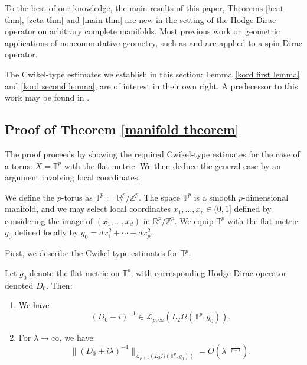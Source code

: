     To the best of our knowledge, the main results of this paper, Theorems \ref{heat thm}, \ref{zeta thm} and \ref{main thm} are new in the setting of the Hodge-Dirac operator on arbitrary complete manifolds. Most previous work on geometric applications of noncommutative geometry, such as \cite{Rennie-2004} and \cite{CGRS2} are applied to a spin Dirac operator. 
        
    The Cwikel-type estimates we establish in this section: Lemma \ref{kord first lemma} and \ref{kord second lemma}, are of interest in their own right. A predecessor to this work may be found in \cite{Rennie-2004}.
    
\subsection{Proof of Theorem \ref{manifold theorem}}

    The proof proceeds by showing the required Cwikel-type estimates for the case of a torus: $X = \mathbb{T}^p$ with the flat metric. We then
    deduce the general case by an argument involving local coordinates.
    
    
     
    We define the $p$-torus as $\mathbb{T}^p := \mathbb{R}^p/\mathbb{Z}^p$. The space $\mathbb{T}^p$ is a smooth $p$-dimensional manifold,
    and we may select local coordinates $x_1,\ldots,x_p \in (0,1]$ defined by considering the image of $(x_1,\ldots,x_d)$ in $\mathbb{R}^p/\mathbb{Z}^p$.
%     
    We equip $\mathbb{T}^p$ with the flat metric $g_0$ defined locally by $g_0 = dx_1^2+\cdots+dx_p^2$. 
    
    
    First, we describe the Cwikel-type estimates for $\mathbb{T}^p$.
    \begin{lem}\label{cwikel}
        Let $g_0$ denote the flat metric on $\mathbb{T}^p$, with corresponding Hodge-Dirac operator denoted $D_0$. Then:
        \begin{enumerate}[{\rm (i)}]
            \item{}\label{flat cwikel 1} We have 
                \begin{equation*}
                    (D_0+i)^{-1} \in \mathcal{L}_{p,\infty}(L_2\Omega(\mathbb{T}^p,g_0)).
                \end{equation*}
            \item{}\label{flat cwikel 2} For $\lambda \to\infty$, we have:
                \begin{equation*}
                    \|(D_0+i\lambda)^{-1}\|_{\mathcal{L}_{p+1}(L_2\Omega(\mathbb{T}^p,g_0))} = O(\lambda^{-\frac{1}{p+1}}).
                \end{equation*}
        \end{enumerate}
    \end{lem}
        
